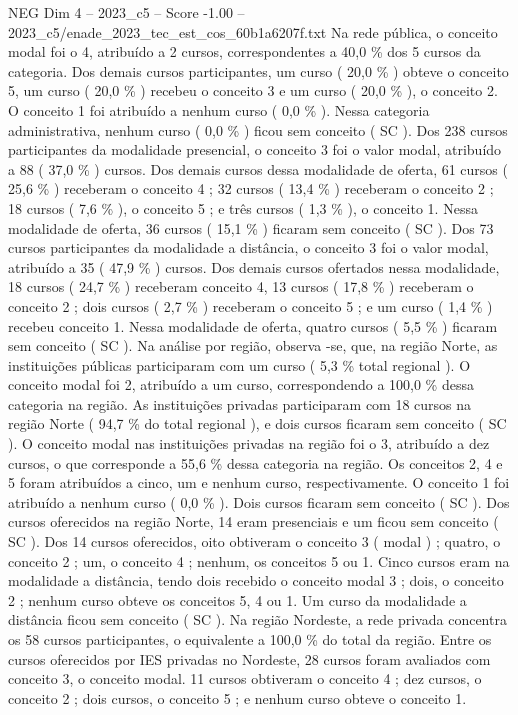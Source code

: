 \begin{textsample}{NEG Dim 4 – 2023\_c5 – Score -1.00 – 2023\_c5/enade\_2023\_tec\_est\_cos\_60b1a6207f.txt}
Na rede pública, o conceito modal foi o 4, atribuído a 2 cursos, correspondentes a 40,0 \% dos 5 cursos da categoria.
Dos demais cursos participantes, um curso ( 20,0 \% ) obteve o conceito 5, um curso ( 20,0 \% ) recebeu o conceito 3 e um curso ( 20,0 \% ), o conceito 2.
O conceito 1 foi atribuído a nenhum curso ( 0,0 \% ).
Nessa categoria administrativa, nenhum curso ( 0,0 \% ) ficou sem conceito ( SC ).
Dos 238 cursos participantes da modalidade presencial, o conceito 3 foi o valor modal, atribuído a 88 ( 37,0 \% ) cursos.
Dos demais cursos dessa modalidade de oferta, 61 cursos ( 25,6 \% ) receberam o conceito 4 ; 32 cursos ( 13,4 \% ) receberam o conceito 2 ; 18 cursos ( 7,6 \% ), o conceito 5 ; e três cursos ( 1,3 \% ), o conceito 1.
Nessa modalidade de oferta, 36 cursos ( 15,1 \% ) ficaram sem conceito ( SC ).
Dos 73 cursos participantes da modalidade a distância, o conceito 3 foi o valor modal, atribuído a 35 ( 47,9 \% ) cursos.
Dos demais cursos ofertados nessa modalidade, 18 cursos ( 24,7 \% ) receberam conceito 4, 13 cursos ( 17,8 \% ) receberam o conceito 2 ; dois cursos ( 2,7 \% ) receberam o conceito 5 ; e um curso ( 1,4 \% ) recebeu conceito 1.
Nessa modalidade de oferta, quatro cursos ( 5,5 \% ) ficaram sem conceito ( SC ).
Na análise por região, observa -se, que, na região Norte, as instituições públicas participaram com um curso ( 5,3 \% total regional ).
O conceito modal foi 2, atribuído a um curso, correspondendo a 100,0 \% dessa categoria na região.
As instituições privadas participaram com 18 cursos na região Norte ( 94,7 \% do total regional ), e dois cursos ficaram sem conceito ( SC ).
O conceito modal nas instituições privadas na região foi o 3, atribuído a dez cursos, o que corresponde a 55,6 \% dessa categoria na região.
Os conceitos 2, 4 e 5 foram atribuídos a cinco, um e nenhum curso, respectivamente.
O conceito 1 foi atribuído a nenhum curso ( 0,0 \% ).
Dois cursos ficaram sem conceito ( SC ).
Dos cursos oferecidos na região Norte, 14 eram presenciais e um ficou sem conceito ( SC ).
Dos 14 cursos oferecidos, oito obtiveram o conceito 3 ( modal ) ; quatro, o conceito 2 ; um, o conceito 4 ; nenhum, os conceitos 5 ou 1.
Cinco cursos eram na modalidade a distância, tendo dois recebido o conceito modal 3 ; dois, o conceito 2 ; nenhum curso obteve os conceitos 5, 4 ou 1.
Um curso da modalidade a distância ficou sem conceito ( SC ).
Na região Nordeste, a rede privada concentra os 58 cursos participantes, o equivalente a 100,0 \% do total da região.
Entre os cursos oferecidos por IES privadas no Nordeste, 28 cursos foram avaliados com conceito 3, o conceito modal. 11 cursos obtiveram o conceito 4 ; dez cursos, o conceito 2 ; dois cursos, o conceito 5 ; e nenhum curso obteve o conceito 1.

\end{textsample}
